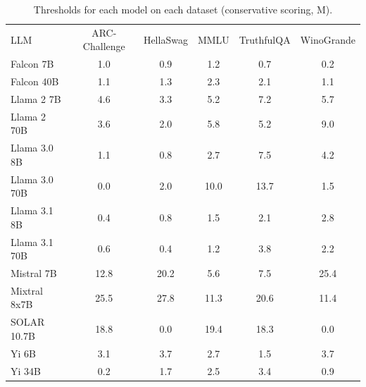 \begin{table}[h]
\caption{Thresholds for each model on each dataset (conservative scoring, M). }
\label{tab:thresholds_logit_margin_k20_w2}
\centering
\begin{tabular}{l S[table-format=3.1] S[table-format=3.1] S[table-format=3.1] S[table-format=3.1] S[table-format=3.1]}
\toprule
LLM & ARC-Challenge & HellaSwag & MMLU & TruthfulQA & WinoGrande \\ 
\cmidrule(lr){1-1} \cmidrule(lr){2-2} \cmidrule(lr){3-3} \cmidrule(lr){4-4} \cmidrule(lr){5-5} \cmidrule(lr){6-6}
Falcon 7B & 1.0 & 0.9 & 1.2 & 0.7 & 0.2\\
Falcon 40B & 1.1 & 1.3 & 2.3 & 2.1 & 1.1\\
Llama 2 7B & 4.6 & 3.3 & 5.2 & 7.2 & 5.7\\
Llama 2 70B & 3.6 & 2.0 & 5.8 & 5.2 & 9.0\\
Llama 3.0 8B & 1.1 & 0.8 & 2.7 & 7.5 & 4.2\\
Llama 3.0 70B & 0.0 & 2.0 & 10.0 & 13.7 & 1.5\\
Llama 3.1 8B & 0.4 & 0.8 & 1.5 & 2.1 & 2.8\\
Llama 3.1 70B & 0.6 & 0.4 & 1.2 & 3.8 & 2.2\\
Mistral 7B & 12.8 & 20.2 & 5.6 & 7.5 & 25.4\\
Mixtral 8x7B & 25.5 & 27.8 & 11.3 & 20.6 & 11.4\\
SOLAR 10.7B & 18.8 & 0.0 & 19.4 & 18.3 & 0.0\\
Yi 6B & 3.1 & 3.7 & 2.7 & 1.5 & 3.7\\
Yi 34B & 0.2 & 1.7 & 2.5 & 3.4 & 0.9\\
\bottomrule
\end{tabular}
\end{table}
